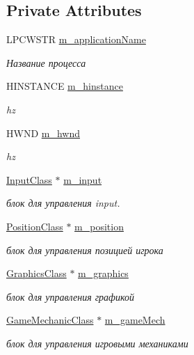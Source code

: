 \subsection*{Private Attributes}
\begin{DoxyCompactItemize}
\item 
L\+P\+C\+W\+S\+TR \hyperlink{class_system_class_a05efe93f7f39e313723db3cba3dd6ab4}{m\+\_\+application\+Name}
\begin{DoxyCompactList}\small\item\em Название процесса \end{DoxyCompactList}\item 
H\+I\+N\+S\+T\+A\+N\+CE \hyperlink{class_system_class_a5571d11de0c4e97af68029eeee9296d3}{m\+\_\+hinstance}
\begin{DoxyCompactList}\small\item\em hz \end{DoxyCompactList}\item 
H\+W\+ND \hyperlink{class_system_class_a74e2eec24e772ae09e42a11a1e83236a}{m\+\_\+hwnd}
\begin{DoxyCompactList}\small\item\em hz \end{DoxyCompactList}\item 
\hyperlink{class_input_class}{Input\+Class} $\ast$ \hyperlink{class_system_class_a59754aa6c2f1183a069961b2999da210}{m\+\_\+input}
\begin{DoxyCompactList}\small\item\em блок для управления input. \end{DoxyCompactList}\item 
\hyperlink{class_position_class}{Position\+Class} $\ast$ \hyperlink{class_system_class_a50f3aa02021aa6813bc2e30dfcb8d8ae}{m\+\_\+position}
\begin{DoxyCompactList}\small\item\em блок для управления позицией игрока \end{DoxyCompactList}\item 
\hyperlink{class_graphics_class}{Graphics\+Class} $\ast$ \hyperlink{class_system_class_a595d53c1d2fa2dad35016fe9b3aa3f01}{m\+\_\+graphics}
\begin{DoxyCompactList}\small\item\em блок для управления графикой \end{DoxyCompactList}\item 
\hyperlink{class_game_mechanic_class}{Game\+Mechanic\+Class} $\ast$ \hyperlink{class_system_class_a536ff2a3fa38a758f694c2dc01219daf}{m\+\_\+game\+Mech}
\begin{DoxyCompactList}\small\item\em блок для управления игровыми механиками \end{DoxyCompactList}\end{DoxyCompactItemize}


